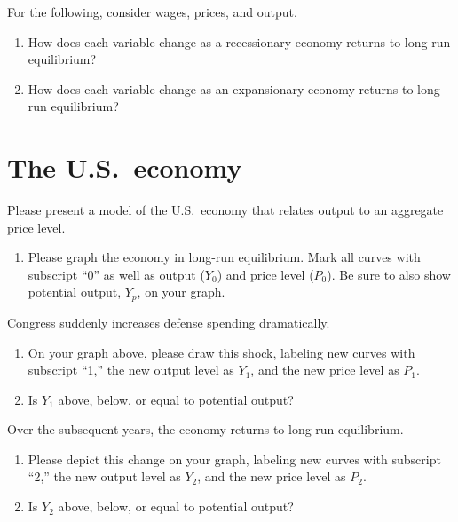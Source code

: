 \documentclass[
    letterpaper,paper=portrait,fleqn,
    DIV=16,fontsize=12pt,twoside=semi,
    parskip=full-,
    headings=standardclasses]
{scrartcl}
\begin{document}
For the following, consider wages, prices, and output.

\begin{enumerate}[resume]

\item How does each variable change as a recessionary economy returns to long-run equilibrium?

\vfill

\item How does each variable change as an expansionary economy returns to long-run equilibrium?

\vfill

\end{enumerate}

\vspace{-2.0\baselineskip}

\clearpage

\section{The U.S.~economy}

Please present a model of the U.S.~economy that relates output to an aggregate price level.

\begin{enumerate}

\item Please graph the economy in long-run equilibrium. Mark all curves with subscript ``0'' as well as output ($Y_0$) and price level ($P_0$). Be sure to also show potential output, $Y_p$, on your graph.

\vfill

\end{enumerate}

Congress suddenly increases defense spending dramatically.

\begin{enumerate}[resume]

\item On your graph above, please draw this shock, labeling new curves with subscript ``1,'' the new output level as $Y_1$, and the new price level as $P_1$.

\item Is $Y_1$ above, below, or equal to potential output? \hfill \underline{\hspace{3in}}

\end{enumerate}

Over the subsequent years, the economy returns to long-run equilibrium.

\begin{enumerate}[resume]

\item Please depict this change on your graph, labeling new curves with subscript ``2,'' the new output level as $Y_2$, and the new price level as $P_2$.

\item Is $Y_2$ above, below, or equal to potential output? \hfill \underline{\hspace{3in}}

\end{enumerate}
\end{document}
